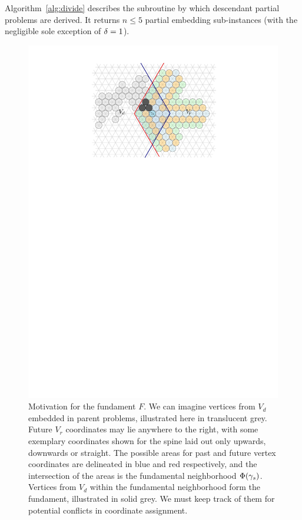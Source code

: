 Algorithm~\ref{alg:divide} describes the subroutine by which descendant partial problems are derived. It returns $n \leq 5$ partial embedding sub-instances (with the negligible sole exception of $\delta = 1$).

\begin{figure}
    \centering
    \includegraphics{graphics/ch4_reach.pdf}
    \caption{Motivation for the fundament $F$. We can imagine vertices from $V_d$ embedded in parent problems, illustrated here in translucent grey. Future $V_r$ coordinates may lie anywhere to the right, with some exemplary coordinates shown for the spine laid out only upwards, downwards or straight. The possible areas for past and future vertex coordinates are delineated in blue and red respectively, and the intersection of the areas is the fundamental neighborhood $\Phi(\gamma_s)$. Vertices from $V_d$ within the fundamental neighborhood form the fundament, illustrated in solid grey. We must keep track of them for potential conflicts in coordinate assignment.}
    \label{fig:ch4_reach}
\end{figure}

